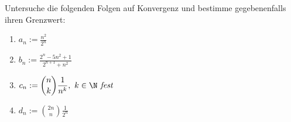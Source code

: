 \begin{prob}
  Untersuche die folgenden Folgen auf Konvergenz und bestimme gegebenenfalls
  ihren Grenzwert:
  \begin{enumerate}[label=(\alph*)]
  \item $\displaystyle a_n := \frac{n^2}{2^n}$
  \item $\displaystyle b_n := \frac{2^n - 5n^2 + 1}{2^{n+1} + n^2}$
  \item
    $\displaystyle c_n := \binom{n}{k}\frac{1}{n^k},\ k \in \N \textit{ fest}$
  \item $\displaystyle d_n := \binom{2n}{n}\frac{1}{2^n}$
  \end{enumerate}
\end{prob}

